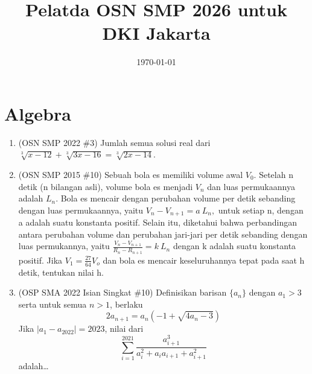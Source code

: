 \documentclass[11pt,letterpaper]{article}
\title{Pelatda OSN SMP 2026 untuk DKI Jakarta}
\date{\today}
\begin{document}
\renewcommand*\contentsname{Daftar Isi}
\tableofcontents

\newpage


\section*{Algebra}

\begin{enumerate}
    \item (OSN SMP 2022 \#3) Jumlah semua solusi real dari $\sqrt[3]{x - 12} + \sqrt[3]{3x - 16} = \sqrt[3]{2x - 14}$.

    \item (OSN SMP 2015 \#10) Sebuah bola es memiliki volume awal $V_{0}.$ Setelah n detik (n bilangan asli), volume bola es menjadi $V_{n}$ dan luas permukaannya adalah $L_{n}$. Bola es mencair dengan perubahan volume per detik sebanding dengan luas permukaannya, yaitu $V_{n}-V_{n+1}=a~L_{n},$ untuk setiap n, dengan a adalah suatu konstanta positif. Selain itu, diketahui bahwa perbandingan antara perubahan volume dan perubahan jari-jari per detik sebanding dengan luas permukannya, yaitu $\frac{V_{n}-V_{n+1}}{R_{n}-R_{n+1}}=k~L_{n}$ dengan k adalah suatu konstanta positif. Jika $V_{1}=\frac{27}{64}V_{o}$ dan bola es mencair keseluruhannya tepat pada saat h detik, tentukan nilai h.

    \item (OSP SMA 2022 Isian Singkat \#10) Definisikan barisan $\{a_n\}$ dengan $a_1 > 3$ serta untuk semua $n > 1$, berlaku
    \[ 2a_{n+1}=a_n(-1+\sqrt{4a_n-3}) \]
    Jika $|a_1-a_{2022}|=2023$, nilai dari
    \[ \sum_{i=1}^{2021}\frac{a_{i+1}^3}{a_i^2+a_ia_{i+1}+a_{i+1}^2} \]
    adalah\dots


\end{enumerate}
\end{document}
